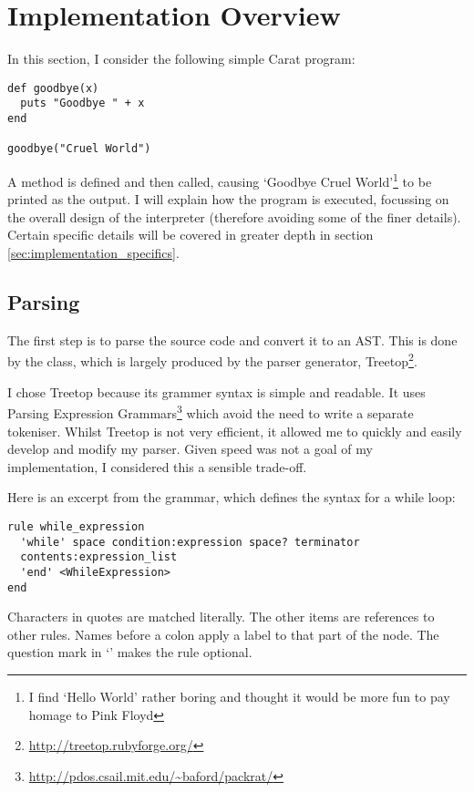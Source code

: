 \section{Implementation Overview}

In this section, I consider the following simple Carat program:

\begin{lstlisting}
def goodbye(x)
  puts "Goodbye " + x
end

goodbye("Cruel World")
\end{lstlisting}

A  method is defined and then called, causing `Goodbye Cruel World'\footnote{I find `Hello World' rather boring and thought it would be more fun to pay homage to Pink Floyd} to be printed as the output. I will explain how the program is executed, focussing on the overall design of the interpreter (therefore avoiding some of the finer details). Certain specific details will be covered in greater depth in section \ref{sec:implementation_specifics}.

\subsection{Parsing}

The first step is to parse the source code and convert it to an AST. This is done by the \-\- class, which is largely produced by the parser generator, Treetop\footnote{\url{http://treetop.rubyforge.org/}}.

I chose Treetop because its grammer syntax is simple and readable. It uses Parsing Expression Grammars\footnote{\url{http://pdos.csail.mit.edu/~baford/packrat/}} which avoid the need to write a separate tokeniser. Whilst Treetop is not very efficient, it allowed me to quickly and easily develop and modify my parser. Given speed was not a goal of my implementation, I considered this a sensible trade-off.

Here is an excerpt from the grammar, which defines the syntax for a while loop:

\begin{lstlisting}[language=treetop]
rule while_expression
  'while' space condition:expression space? terminator
  contents:expression_list
  'end' <WhileExpression>
end
\end{lstlisting}

Characters in quotes are matched literally. The other items are references to other rules. Names before a colon apply a label to that part of the node. The question mark in `' makes the rule optional.

